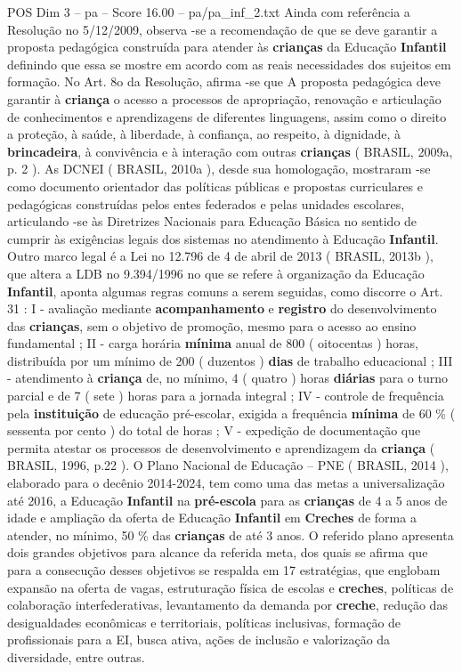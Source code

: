 \begin{textsample}{POS Dim 3 – pa – Score 16.00 – pa/pa\_inf\_2.txt}
Ainda com referência a Resolução no 5/12/2009, observa -se a recomendação de que se deve garantir a proposta pedagógica construída para atender às \textbf{crianças} da Educação \textbf{Infantil} definindo que essa se mostre em acordo com as reais necessidades dos sujeitos em formação.
No Art. 8o da Resolução, afirma -se que A proposta pedagógica deve garantir à \textbf{criança} o acesso a processos de apropriação, renovação e articulação de conhecimentos e aprendizagens de diferentes linguagens, assim como o direito a proteção, à saúde, à liberdade, à confiança, ao respeito, à dignidade, à \textbf{brincadeira}, à convivência e à interação com outras \textbf{crianças} ( BRASIL, 2009a, p. 2 ).
As DCNEI ( BRASIL, 2010a ), desde sua homologação, mostraram -se como documento orientador das políticas públicas e propostas curriculares e pedagógicas construídas pelos entes federados e pelas unidades escolares, articulando -se às Diretrizes Nacionais para Educação Básica no sentido de cumprir às exigências legais dos sistemas no atendimento à Educação \textbf{Infantil}.
Outro marco legal é a Lei no 12.796 de 4 de abril de 2013 ( BRASIL, 2013b ), que altera a LDB no 9.394/1996 no que se refere à organização da Educação \textbf{Infantil}, aponta algumas regras comuns a serem seguidas, como discorre o Art. 31 : I - avaliação mediante \textbf{acompanhamento} e \textbf{registro} do desenvolvimento das \textbf{crianças}, sem o objetivo de promoção, mesmo para o acesso ao ensino fundamental ; II - carga horária \textbf{mínima} anual de 800 ( oitocentas ) horas, distribuída por um mínimo de 200 ( duzentos ) \textbf{dias} de trabalho educacional ; III - atendimento à \textbf{criança} de, no mínimo, 4 ( quatro ) horas \textbf{diárias} para o turno parcial e de 7 ( sete ) horas para a jornada integral ; IV - controle de frequência pela \textbf{instituição} de educação pré-escolar, exigida a frequência \textbf{mínima} de 60 \% ( sessenta por cento ) do total de horas ; V - expedição de documentação que permita atestar os processos de desenvolvimento e aprendizagem da \textbf{criança} ( BRASIL, 1996, p.22 ).
O Plano Nacional de Educação – PNE ( BRASIL, 2014 ), elaborado para o decênio 2014-2024, tem como uma das metas a universalização até 2016, a Educação \textbf{Infantil} na \textbf{pré-escola} para as \textbf{crianças} de 4 a 5 anos de idade e ampliação da oferta de Educação \textbf{Infantil} em \textbf{Creches} de forma a atender, no mínimo, 50 \% das \textbf{crianças} de até 3 anos.
O referido plano apresenta dois grandes objetivos para alcance da referida meta, dos quais se afirma que para a consecução desses objetivos se respalda em 17 estratégias, que englobam expansão na oferta de vagas, estruturação física de escolas e \textbf{creches}, políticas de colaboração interfederativas, levantamento da demanda por \textbf{creche}, redução das desigualdades econômicas e territoriais, políticas inclusivas, formação de profissionais para a EI, busca ativa, ações de inclusão e valorização da diversidade, entre outras.

\end{textsample}
